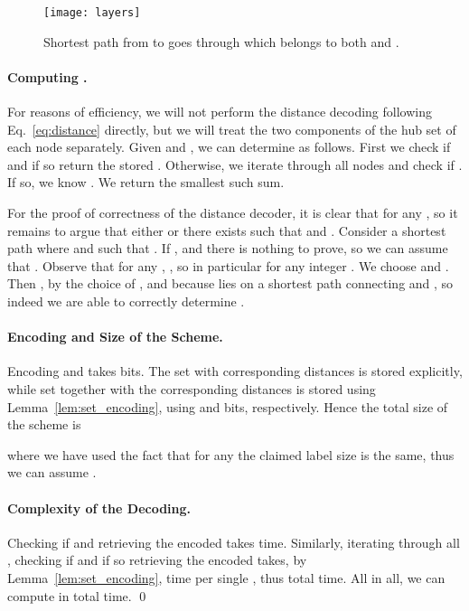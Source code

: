 \documentclass{article}[11pt,letter]
\begin{document}
\begin{figure}[t]
  \centering
    \vspace*{-2mm}
    \texttt{[image: layers]}
    \vspace*{-2mm}
    \caption{Shortest path from  to  goes through  which belongs to both  and .}
    \label{fig:layers}
\end{figure}


\paragraph{Computing .} For reasons of efficiency, we will not perform the distance decoding following Eq.~\eqref{eq:distance} directly, but we will treat the two components of the hub set of each node separately. Given  and , we can determine
 as follows. First we check if  and if so return the stored .
Otherwise, we iterate through all nodes  and check if .
If so, we know . We return the smallest such sum.

For the proof of correctness of the distance decoder, it is clear that  for any , so it remains to argue that either  or there exists  such that  and
. Consider a shortest path  where  and  such that . If  ,  and there is nothing to prove,
so we can assume that .  Observe that for any , ,
so in particular  for any integer .
We choose  and .
Then ,  by the choice of , and 
because  lies on a shortest path connecting  and , so indeed we are able to correctly
determine .

\paragraph{Encoding and Size of the Scheme.} Encoding  and  takes  bits.
The set  with corresponding distances is stored explicitly, while set  together with the corresponding distances is stored using Lemma~\ref{lem:set_encoding}, using  and
 bits, respectively.
Hence the total size of the scheme is 

where we have used the fact that for any  the claimed label size is the same, thus we can assume .

\paragraph{Complexity of the Decoding.} Checking if  and retrieving the encoded  takes  time.
Similarly,  iterating through all , checking if  and
if so retrieving the encoded  takes, by Lemma~\ref{lem:set_encoding},  time per single ,  thus  total time.
All in all, we can compute  in 
total time.
\qed
\end{document}
